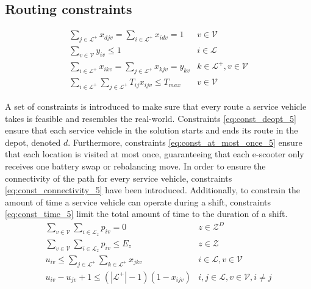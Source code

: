 \subsection{Routing constraints}
\begin{eqnarray}
     \displaystyle\sum_{j\in \mathcal{L}^+}x_{djv} = \displaystyle\sum_{i\in \mathcal{L}^+}x_{idv} = 1 & v\in \mathcal{V} \label{eq:const_deopt_5}\\ 
	\displaystyle\sum_{v\in \mathcal{V}}y_{iv} \leq 1 & i \in \mathcal{L} \label{eq:const_at_most_once_5}\\
	\displaystyle\sum_{i\in \mathcal{L}^{+}}x_{ikv} = \displaystyle\sum_{j\in \mathcal{L}^{+}}x_{kjv} = y_{kv} & k \in \mathcal{L}^{+}, v\in \mathcal{V} \label{eq:const_connectivity_5}\\
    \displaystyle\sum_{i \in \mathcal{L}^{+}}\displaystyle\sum_{j \in \mathcal{L}^{+}} T_{ij}x_{ijv} \leq T_{max} & v\in \mathcal{V} \label{eq:const_time_5}
\end{eqnarray}

A set of constraints is introduced  to make sure that every route a service vehicle takes is feasible and resembles the real-world. Constraints \eqref{eq:const_deopt_5} ensure that each service vehicle in the solution starts and ends its route in the depot, denoted $d$. Furthermore, constraints \eqref{eq:const_at_most_once_5} ensure that each location is visited at most once, guaranteeing that each e-scooter only receives one battery swap or rebalancing move. In order to ensure the connectivity of the path for every service vehicle, constraints \eqref{eq:const_connectivity_5} have been introduced. Additionally, to constrain the amount of time a service vehicle can operate during a shift, constraints \eqref{eq:const_time_5} limit the total amount of time to the duration of a shift. 
\begin{eqnarray}
	\displaystyle\sum_{v\in \mathcal{V}}\displaystyle\sum_{i\in \mathcal{L}_z} p_{iv} = 0  & z\in \mathcal{Z}^D \label{eq:pickup_zone_5}\\
	\displaystyle\sum_{v\in \mathcal{V}}\displaystyle\sum_{i\in \mathcal{L}_z} p_{iv} \leq E_z & z\in \mathcal{Z} \label{eq:pickup_zone_2_5}\\
    u_{iv} \leq \displaystyle\sum_{j \in \mathcal{L}^{+}} \displaystyle\sum_{k \in \mathcal{L}^{+}} x_{jkv} &  i\in \mathcal{L}, v\in \mathcal{V} \label{eq:const_subtour1_5}\\
    u_{iv} - u_{jv} +1 \leq (|\mathcal{L}^{+}|-1)(1-x_{ijv})&   i,j \in \mathcal{L}, v\in \mathcal{V}, i \neq j \label{eq:const_subtour2_5}
\end{eqnarray}

